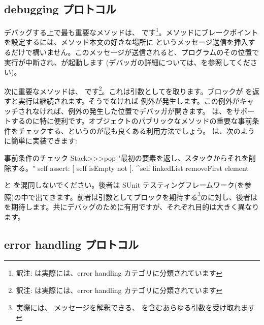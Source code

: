 \documentclass[a4paper,10pt,twoside]{book}
\begin{document}

\subsection{debugging プロトコル}

デバッグする上で最も重要なメソッドは、 です\footnote{訳注:  は実際には、error handling カテゴリに分類されています}。メソッドにブレークポイントを設定するには、メソッド本文の好きな場所に  というメッセージ送信を挿入するだけで構いません。このメッセージが送信されると、プログラムのその位置で実行が中断され、が起動します
(デバッガの詳細については、を参照してください)。


次に重要なメソッドは、 です\footnote{訳注:  は実際には、error handling カテゴリに分類されています}。これは引数としてを取ります。ブロックが  を返すと実行は継続されます。そうでなければ  例外が発生します。この例外がキャッチされなければ、例外の発生した位置でデバッガが開きます。 は、をサポートするのに特に便利です。オブジェクトのパブリックなメソッドの重要な事前条件をチェックする、というのが最も良くある利用方法でしょう。 は、次のように簡単に実装できます:%

\begin{method}{事前条件のチェック}
Stack>>>pop
    "最初の要素を返し、スタックからそれを削除する。"
    self assert: [ self isEmpty not ].
    ^self linkedList removeFirst element
\end{method}

 と  を混同しないでください。後者は SUnit テスティングフレームワーク(を参照)の中で出てきます。前者は引数としてブロックを期待する\footnote{実際には、 メッセージを解釈できる、 を含むあらゆる引数を受け取れます}のに対し、後者は  を期待します。共にデバッグのために有用ですが、それぞれ目的は大きく異なります。

\subsection{error handling プロトコル}
\end{document}
